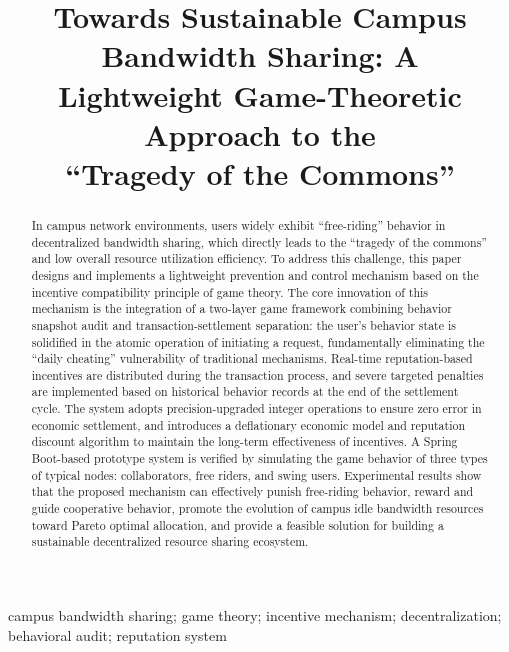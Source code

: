 \documentclass[conference,letterpaper]{IEEEtran}
\begin{document}
\title{\LARGE Towards Sustainable Campus Bandwidth Sharing: A\\
Lightweight Game-Theoretic Approach to the\\
``Tragedy of the Commons''}

\author{}

\maketitle

\nocite{zhang2007,wang2019,yang2022,li2018,chen2020,buchegger2002,xu2018,hardin1968,qiu2022,lin2018,hurwicz1973}

\begin{abstract}
In campus network environments, users widely exhibit ``free-riding'' behavior in decentralized bandwidth sharing, which directly leads to the ``tragedy of the commons'' and low overall resource utilization efficiency. To address this challenge, this paper designs and implements a lightweight prevention and control mechanism based on the incentive compatibility principle of game theory. The core innovation of this mechanism is the integration of a two-layer game framework combining behavior snapshot audit and transaction-settlement separation: the user's behavior state is solidified in the atomic operation of initiating a request, fundamentally eliminating the ``daily cheating'' vulnerability of traditional mechanisms. Real-time reputation-based incentives are distributed during the transaction process, and severe targeted penalties are implemented based on historical behavior records at the end of the settlement cycle. The system adopts precision-upgraded integer operations to ensure zero error in economic settlement, and introduces a deflationary economic model and reputation discount algorithm to maintain the long-term effectiveness of incentives. A Spring Boot-based prototype system is verified by simulating the game behavior of three types of typical nodes: collaborators, free riders, and swing users. Experimental results show that the proposed mechanism can effectively punish free-riding behavior, reward and guide cooperative behavior, promote the evolution of campus idle bandwidth resources toward Pareto optimal allocation, and provide a feasible solution for building a sustainable decentralized resource sharing ecosystem.
\end{abstract}

\begin{IEEEkeywords}
campus bandwidth sharing; game theory; incentive mechanism; decentralization; behavioral audit; reputation system
\end{IEEEkeywords}
\end{document}
